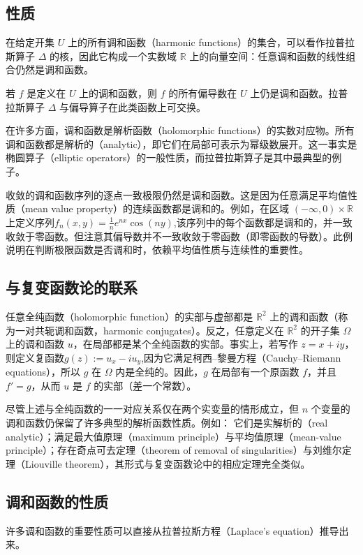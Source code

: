 \subsection{性质}
在给定开集 \( U \) 上的所有调和函数（harmonic functions）的集合，可以看作拉普拉斯算子 \(\Delta\) 的核，因此它构成一个实数域 \(\mathbb{R}\) 上的向量空间：任意调和函数的线性组合仍然是调和函数。

若 \( f \) 是定义在 \( U \) 上的调和函数，则 \( f \) 的所有偏导数在 \( U \) 上仍是调和函数。拉普拉斯算子 \(\Delta\) 与偏导算子在此类函数上可交换。

在许多方面，调和函数是解析函数（holomorphic functions）的实数对应物。所有调和函数都是解析的（analytic），即它们在局部可表示为幂级数展开。这一事实是椭圆算子（elliptic operators）的一般性质，而拉普拉斯算子是其中最典型的例子。

收敛的调和函数序列的逐点一致极限仍然是调和函数。这是因为任意满足平均值性质（mean value property）的连续函数都是调和的。例如，在区域 \((-\infty, 0) \times \mathbb{R}\) 上定义序列$f_{n}(x,y) = \frac{1}{n} e^{nx} \cos(ny)$,该序列中的每个函数都是调和的，并一致收敛于零函数。但注意其偏导数并不一致收敛于零函数（即零函数的导数）。此例说明在判断极限函数是否调和时，依赖平均值性质与连续性的重要性。
\subsection{与复变函数论的联系}
任意全纯函数（holomorphic function）的实部与虚部都是 \(\mathbb{R}^2\) 上的调和函数（称为一对共轭调和函数，harmonic conjugates）。反之，任意定义在 \(\mathbb{R}^2\) 的开子集 \(\Omega\) 上的调和函数 \(u\)，在局部都是某个全纯函数的实部。事实上，若写作 \( z = x + i y \)，则定义复函数\(g(z) := u_x - i u_y\),因为它满足柯西–黎曼方程（Cauchy–Riemann equations），所以 \( g \) 在 \(\Omega\) 内是全纯的。因此，\( g \) 在局部有一个原函数 \( f \)，并且 \( f' = g \)，从而 \( u \) 是 \( f \) 的实部（差一个常数）。

尽管上述与全纯函数的一一对应关系仅在两个实变量的情形成立，但 \( n \) 个变量的调和函数仍保留了许多典型的解析函数性质。例如：  它们是实解析的（real analytic）；满足最大值原理（maximum principle）与平均值原理（mean-value principle）；存在奇点可去定理（theorem of removal of singularities）与刘维尔定理（Liouville theorem），其形式与复变函数论中的相应定理完全类似。
\subsection{调和函数的性质}
许多调和函数的重要性质可以直接从拉普拉斯方程（Laplace's equation）推导出来。
